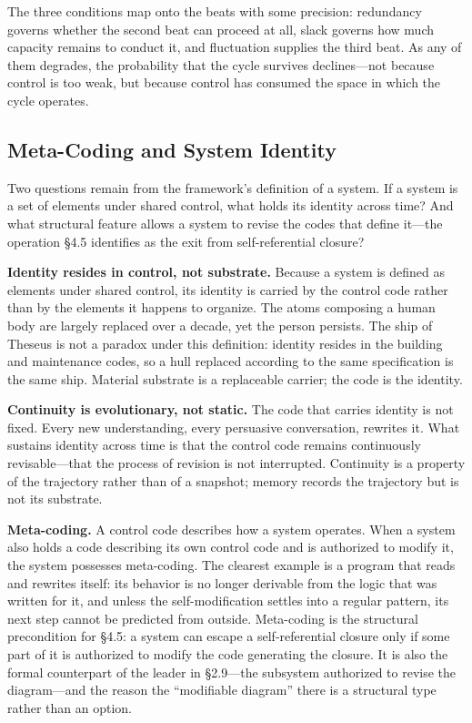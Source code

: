 \documentclass[11pt,a4paper]{article}
\begin{document}
The three conditions map onto the beats with some precision: redundancy governs whether the second beat can proceed at all, slack governs how much capacity remains to conduct it, and fluctuation supplies the third beat. As any of them degrades, the probability that the cycle survives declines---not because control is too weak, but because control has consumed the space in which the cycle operates.

\subsection{Meta-Coding and System Identity}

Two questions remain from the framework's definition of a system. If a system is a set of elements under shared control, what holds its identity across time? And what structural feature allows a system to revise the codes that define it---the operation \S4.5 identifies as the exit from self-referential closure?

\textbf{Identity resides in control, not substrate.} Because a system is defined as elements under shared control, its identity is carried by the control code rather than by the elements it happens to organize. The atoms composing a human body are largely replaced over a decade, yet the person persists. The ship of Theseus is not a paradox under this definition: identity resides in the building and maintenance codes, so a hull replaced according to the same specification is the same ship. Material substrate is a replaceable carrier; the code is the identity.

\textbf{Continuity is evolutionary, not static.} The code that carries identity is not fixed. Every new understanding, every persuasive conversation, rewrites it. What sustains identity across time is that the control code remains continuously revisable---that the process of revision is not interrupted. Continuity is a property of the trajectory rather than of a snapshot; memory records the trajectory but is not its substrate.

\textbf{Meta-coding.} A control code describes how a system operates. When a system also holds a code describing its own control code and is authorized to modify it, the system possesses meta-coding. The clearest example is a program that reads and rewrites itself: its behavior is no longer derivable from the logic that was written for it, and unless the self-modification settles into a regular pattern, its next step cannot be predicted from outside. Meta-coding is the structural precondition for \S4.5: a system can escape a self-referential closure only if some part of it is authorized to modify the code generating the closure. It is also the formal counterpart of the leader in \S2.9---the subsystem authorized to revise the diagram---and the reason the ``modifiable diagram'' there is a structural type rather than an option.
\end{document}
